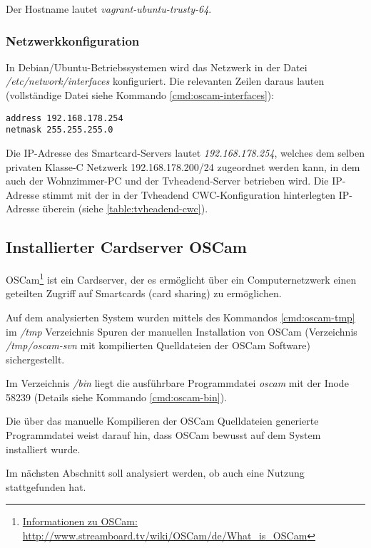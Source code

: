 Der Hostname lautet \textit{vagrant-ubuntu-trusty-64}.

\subsubsection{Netzwerkkonfiguration}
\label{sec:cardserver-network}

In Debian/Ubuntu-Betriebssystemen wird das Netzwerk in der Datei \textit{/etc/network/interfaces} konfiguriert. Die relevanten Zeilen daraus lauten (vollständige Datei siehe Kommando \autoref{cmd:oscam-interfaces}):

\begin{verbatim}
address 192.168.178.254
netmask 255.255.255.0
\end{verbatim}

Die IP-Adresse des Smartcard-Servers lautet \textit{192.168.178.254}, welches dem selben privaten \mbox{Klasse-C} Netzwerk 192.168.178.200/24 zugeordnet werden kann, in dem auch der Wohnzimmer-PC und der Tvheadend-Server betrieben wird. Die IP-Adresse stimmt mit der in der Tvheadend CWC-Konfiguration hinterlegten IP-Adresse überein (siehe \autoref{table:tvheadend-cwc}).

\subsection{Installierter Cardserver OSCam}

OSCam\footnote{\href{http://www.streamboard.tv/wiki/OSCam/de/What\_is\_OSCam}{Informationen zu OSCam: http://www.streamboard.tv/wiki/OSCam/de/What\_is\_OSCam}} ist ein Cardserver, der es ermöglicht über ein Computernetzwerk einen geteilten Zugriff auf Smartcards (card sharing) zu ermöglichen.

Auf dem analysierten System wurden mittels des Kommandos \autoref{cmd:oscam-tmp} im \textit{/tmp} Verzeichnis Spuren der manuellen Installation von OSCam (Verzeichnis \textit{/tmp/oscam-svn} mit kompilierten Quelldateien der OSCam Software) sichergestellt. 

Im Verzeichnis \textit{/bin} liegt die ausführbare Programmdatei \textit{oscam} mit der Inode 58239 (Details siehe Kommando \autoref{cmd:oscam-bin}).

Die über das manuelle Kompilieren der OSCam Quelldateien generierte Programmdatei weist darauf hin, dass OSCam bewusst auf dem System installiert wurde. 

Im nächsten Abschnitt soll analysiert werden, ob auch eine Nutzung stattgefunden hat.

